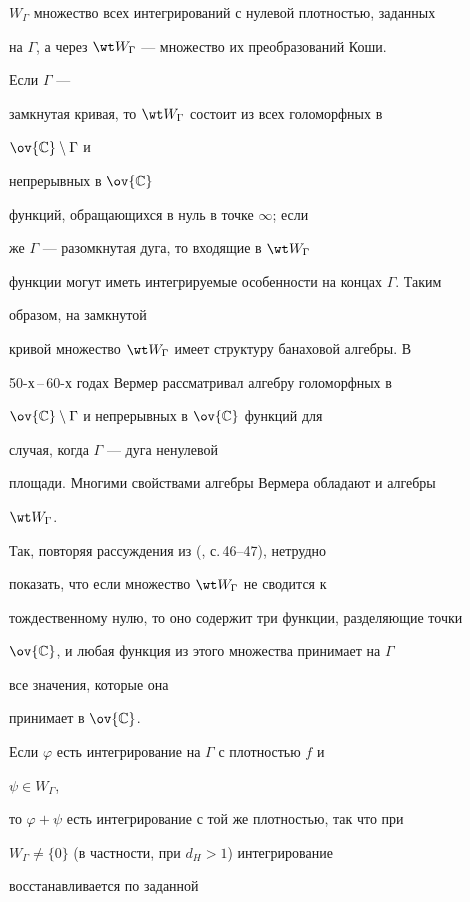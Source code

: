 $W_\Gamma$ множество всех интегрирований с нулевой плотностью, заданных 


на $\Gamma$, а через $\wt W_\Gamma$ --- множество их преобразований Коши. 


Если $\Gamma$ --- 


замкнутая кривая, то $\wt W_\Gamma$ состоит из всех голоморфных в 


$\ov{\Bbb C}\setminus\Gamma$ и 


непрерывных в $\ov{\Bbb C}$ 


функций, обращающихся в нуль в точке $\infty$; если 


же $\Gamma$ --- разомкнутая дуга, то входящие в $\wt W_\Gamma$ 


функции могут иметь интегрируемые особенности на концах $\Gamma$. Таким 


образом, на замкнутой 


кривой множество $\wt W_\Gamma$ имеет структуру банаховой алгебры. В 


50-х\,--\,60-х годах Вермер рассматривал алгебру голоморфных в 


$\ov{\Bbb C}\setminus\Gamma$ и непрерывных в $\ov{\Bbb C}$ функций для 


случая, когда $\Gamma$ --- дуга ненулевой 


площади. Многими свойствами алгебры Вермера обладают и алгебры 


$\wt W_\Gamma$. 


Так, повторяя рассуждения из (\cite{20}, с.\,46--47), нетрудно 


показать, что если множество $\wt W_\Gamma$ не сводится к 


тождественному нулю, то оно содержит три функции, разделяющие точки 


$\ov{\Bbb C}$, и любая функция из этого множества принимает на $\Gamma$ 


все значения, которые она 


принимает в $\ov{\Bbb C}$. 


 


Если $\varphi$ есть интегрирование на $\Gamma$ с плотностью $f$ и 


$\psi\in W_\Gamma$, 


то $\varphi+\psi$ есть интегрирование с той же плотностью, так что при 


$W_\Gamma\ne\{0\}$ (в частности, при $d_H>1$) интегрирование 


восстанавливается по заданной 


